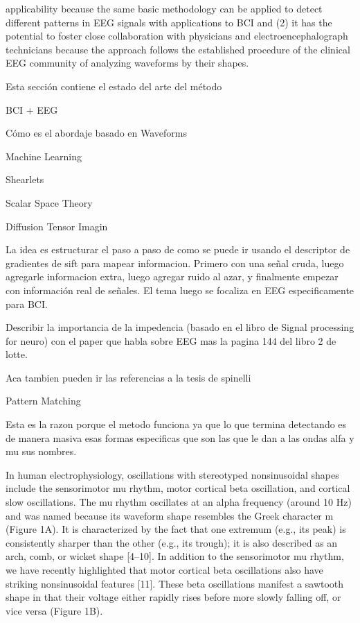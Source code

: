 applicability because the same basic methodology can be applied to detect different patterns in EEG signals with applications to BCI and (2) it has the potential to foster close collaboration with physicians and electroencephalograph technicians because the approach follows the established procedure of the clinical EEG community of analyzing waveforms by their shapes.

Esta sección contiene el estado del arte del método

BCI + EEG

Cómo es el abordaje basado en Waveforms

Machine Learning

Shearlets

Scalar Space Theory


Diffusion Tensor Imagin

La idea es estructurar el paso a paso de como se puede ir usando el descriptor de gradientes de sift para 
mapear informacion.  Primero con una señal cruda, luego agregarle informacion extra, luego agregar ruido al azar, y finalmente empezar con información real de señales.  El tema luego se focaliza en EEG especificamente para BCI.


Describir la importancia de la impedencia (basado en el libro de Signal processing for neuro) con el paper que habla sobre EEG mas la pagina 144 del libro 2 de lotte.

Aca tambien pueden ir las referencias a la tesis de spinelli

Pattern Matching


Esta es la razon porque el metodo funciona ya que lo que termina detectando es de manera masiva
esas formas especificas que son las que le dan a las ondas alfa y mu sus nombres.

In human electrophysiology, oscillations with stereotyped nonsinusoidal shapes include the
sensorimotor mu rhythm, motor cortical beta oscillation, and cortical slow oscillations. The mu
rhythm oscillates at an alpha frequency (around 10 Hz) and was named because its waveform
shape resembles the Greek character m (Figure 1A). It is characterized by the fact that one
extremum (e.g., its peak) is consistently sharper than the other (e.g., its trough); it is also
described as an arch, comb, or wicket shape [4–10].
In addition to the sensorimotor mu rhythm, we have recently highlighted that motor cortical beta
oscillations also have striking nonsinusoidal features [11]. These beta oscillations manifest a
sawtooth shape in that their voltage either rapidly rises before more slowly falling off, or vice
versa (Figure 1B).


